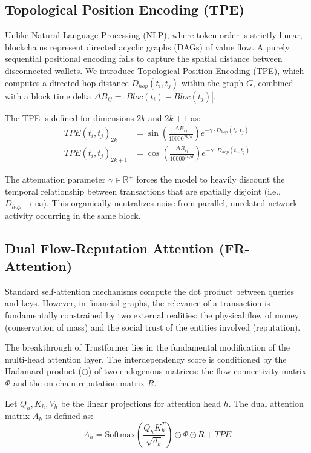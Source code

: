 \documentclass[conference,10pt]{IEEEtran}
\begin{document}
\subsection{Topological Position Encoding (TPE)}
Unlike Natural Language Processing (NLP), where token order is strictly linear, blockchains represent directed acyclic graphs (DAGs) of value flow. A purely sequential positional encoding fails to capture the spatial distance between disconnected wallets. We introduce Topological Position Encoding (TPE), which computes a directed hop distance $D_{hop}(t_i, t_j)$ within the graph $G$, combined with a block time delta $\Delta B_{ij} = |Bloc(t_i) - Bloc(t_j)|$.

The TPE is defined for dimensions $2k$ and $2k+1$ as:
\begin{align}
TPE(t_i, t_j)_{2k} &= \sin \left( \frac{\Delta B_{ij}}{10000^{2k/d}} \right) e^{-\gamma \cdot D_{hop}(t_i, t_j)} \\
TPE(t_i, t_j)_{2k+1} &= \cos \left( \frac{\Delta B_{ij}}{10000^{2k/d}} \right) e^{-\gamma \cdot D_{hop}(t_i, t_j)}
\end{align}

The attenuation parameter $\gamma \in \mathbb{R}^+$ forces the model to heavily discount the temporal relationship between transactions that are spatially disjoint (i.e., $D_{hop} \to \infty$). This organically neutralizes noise from parallel, unrelated network activity occurring in the same block.

\subsection{Dual Flow-Reputation Attention (FR-Attention)}
Standard self-attention mechanisms compute the dot product between queries and keys. However, in financial graphs, the relevance of a transaction is fundamentally constrained by two external realities: the physical flow of money (conservation of mass) and the social trust of the entities involved (reputation).

The breakthrough of Trustformer lies in the fundamental modification of the multi-head attention layer. The interdependency score is conditioned by the Hadamard product ($\odot$) of two endogenous matrices: the flow connectivity matrix $\Phi$ and the on-chain reputation matrix $R$.

Let $Q_h, K_h, V_h$ be the linear projections for attention head $h$. The dual attention matrix $A_h$ is defined as:
\begin{equation}
A_h = \text{Softmax} \left( \frac{Q_h K_h^T}{\sqrt{d_k}} \right) \odot \Phi \odot R + TPE
\end{equation}
\end{document}

